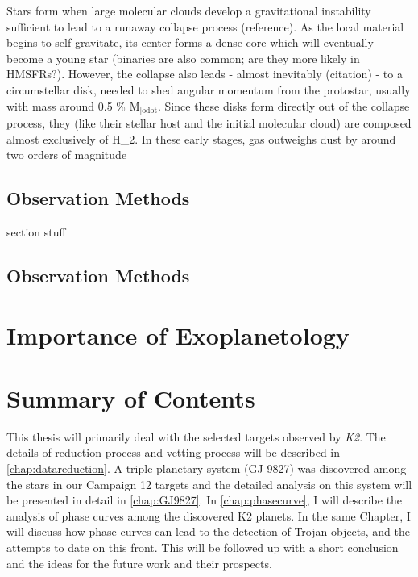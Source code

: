 Stars form when large molecular clouds develop a gravitational instability sufficient to lead to a runaway collapse process (reference). As the local material begins to self-gravitate, its center forms a dense core which will eventually become a young star (binaries are also common; are they more likely in HMSFRs?). However, the collapse also leads - almost inevitably (citation) - to a circumstellar disk, needed to shed angular momentum from the protostar, usually with mass around 0.5 \% M$_{\text{]odot}}$. Since these disks form directly out of the collapse process, they (like their stellar host and the initial molecular cloud) are composed almost exclusively of H_2. In these early stages, gas outweighs dust by around two orders of magnitude





\subsection{Observation Methods}




section stuff





\subsection{Observation Methods}






\section{Importance of Exoplanetology}







\section{Summary of Contents}
This thesis will primarily deal with the selected targets observed by \textit{K2}. The details of reduction process and vetting process will be described in \autoref{chap:datareduction}. A triple planetary system (GJ 9827) was discovered among the stars in our Campaign 12 targets and the detailed analysis on this system will be presented in detail in \autoref{chap:GJ9827}. In \autoref{chap:phasecurve}, I will describe the analysis of phase curves among the discovered K2 planets.  In the same Chapter, I will discuss how phase curves can lead to the detection of Trojan objects, and the attempts to date on this front. This will be followed up with a short conclusion and the ideas for the future work and their prospects.

